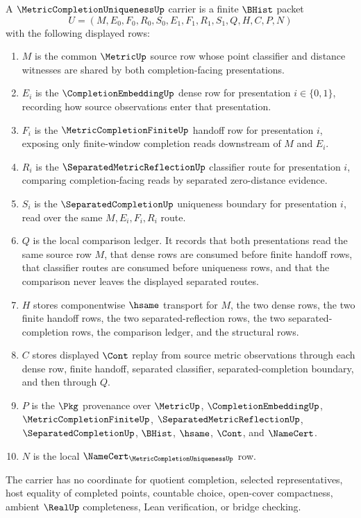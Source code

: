 \begin{definition}
\label{def:metric-completion-uniqueness-carrier}
A $\MetricCompletionUniquenessUp$ carrier is a finite $\BHist$ packet
$$
U=(M,E_0,F_0,R_0,S_0,E_1,F_1,R_1,S_1,Q,H,C,P,N)
$$
with the following displayed rows:
\begin{enumerate}
\item $M$ is the common $\MetricUp$ source row whose point classifier and distance witnesses are shared by both completion-facing presentations.
\item $E_i$ is the $\CompletionEmbeddingUp$ dense row for presentation $i\in\{0,1\}$, recording how source observations enter that presentation.
\item $F_i$ is the $\MetricCompletionFiniteUp$ handoff row for presentation $i$, exposing only finite-window completion reads downstream of $M$ and $E_i$.
\item $R_i$ is the $\SeparatedMetricReflectionUp$ classifier route for presentation $i$, comparing completion-facing reads by separated zero-distance evidence.
\item $S_i$ is the $\SeparatedCompletionUp$ uniqueness boundary for presentation $i$, read over the same $M,E_i,F_i,R_i$ route.
\item $Q$ is the local comparison ledger. It records that both presentations read the same source row $M$, that dense rows are consumed before finite handoff rows, that classifier routes are consumed before uniqueness rows, and that the comparison never leaves the displayed separated routes.
\item $H$ stores componentwise $\hsame$ transport for $M$, the two dense rows, the two finite handoff rows, the two separated-reflection rows, the two separated-completion rows, the comparison ledger, and the structural rows.
\item $C$ stores displayed $\Cont$ replay from source metric observations through each dense row, finite handoff, separated classifier, separated-completion boundary, and then through $Q$.
\item $P$ is the $\Pkg$ provenance over $\MetricUp$, $\CompletionEmbeddingUp$, $\MetricCompletionFiniteUp$, $\SeparatedMetricReflectionUp$, $\SeparatedCompletionUp$, $\BHist$, $\hsame$, $\Cont$, and $\NameCert$.
\item $N$ is the local $\NameCert_{\MetricCompletionUniquenessUp}$ row.
\end{enumerate}
The carrier has no coordinate for quotient completion, selected representatives, host equality of completed points, countable choice, open-cover compactness, ambient $\RealUp$ completeness, Lean verification, or bridge checking.
\end{definition}

